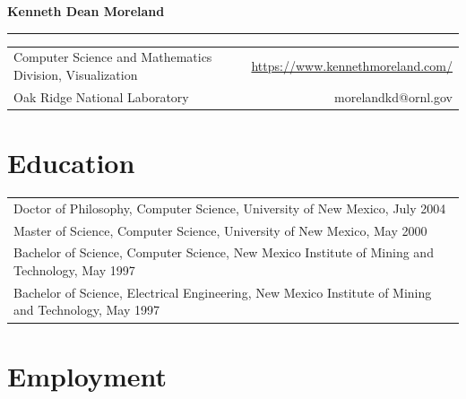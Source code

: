\documentclass{article}
\date{\today}
\begin{document}
\begin{center}
  \textbf{\LARGE Kenneth Dean Moreland}
\end{center}

\rule{\textwidth}{1mm}

\begin{center}
  \begin{tabular*}{\textwidth}{@{\extracolsep{\fill}}lr}
    Computer Science and Mathematics Division, Visualization  & \url{https://www.kennethmoreland.com/} \\
    Oak Ridge National Laboratory                 & morelandkd@ornl.gov \\
  \end{tabular*}
\end{center}

\begin{center}
  {\large
    \makeatletter
    \@date
    \makeatother
  }
\end{center}


\section*{Education}

\begin{tabular}{l}
  Doctor of Philosophy, Computer Science, University of New Mexico, July 2004 \\
  Master of Science, Computer Science, University of New Mexico, May 2000 \\
  Bachelor of Science, Computer Science, New Mexico Institute of Mining and Technology, May 1997 \\
  Bachelor of Science, Electrical Engineering, New Mexico Institute of Mining and Technology, May 1997 \\
\end{tabular}


\section*{Employment}
\end{document}
